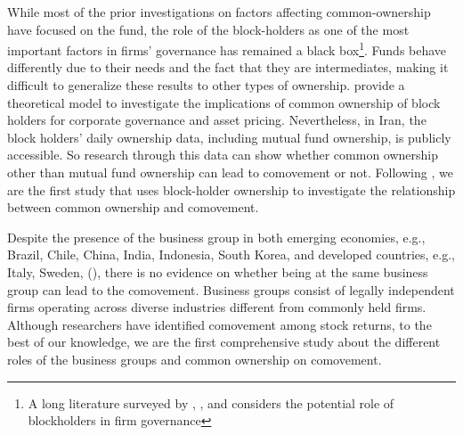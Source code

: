 While most of the prior investigations on factors affecting common-ownership have focused on the fund, the role of the block-holders as one of the most important factors in firms' governance has remained a black box\footnote{A long literature surveyed by \cite{holderness2003survey}, \cite{edmans2014blockholders}, and \cite{edmans2017blockholders} considers the potential role of blockholders in firm governance}. Funds behave differently due to their needs and the fact that they are intermediates, making it difficult to generalize these results to other types of ownership. \cite{edmans2014 governance} provide a theoretical model to investigate the implications of common ownership of block holders for corporate governance and asset pricing. Nevertheless, in Iran, the block holders' daily ownership data, including mutual fund ownership, is publicly accessible. So research through this data can show whether common ownership other than mutual fund ownership can lead to comovement or not. Following \cite{AntonPolk}, we are the first study that uses block-holder ownership to investigate the relationship between common ownership and comovement.
	
	

		
Despite the presence of the business group in both emerging economies, e.g., Brazil, Chile, China, India, Indonesia, South Korea, and developed countries, e.g., Italy, Sweden, (\cite{khanna2007business}), there is no evidence on whether being at the same business group can lead to the comovement. Business groups consist of legally independent firms operating across diverse industries different from commonly held firms. Although researchers have identified comovement among stock
returns,  to the best of our knowledge, we are the first comprehensive study about the different roles of the business groups and common ownership on comovement. 




%	
%	


